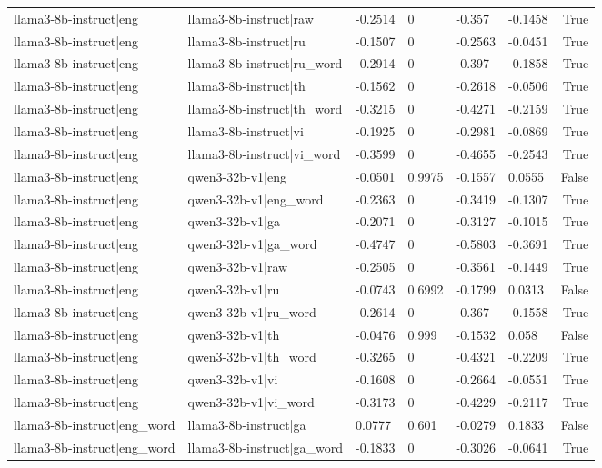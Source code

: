 \begin{table}
\begin{tabular}{llllllr}
llama3-8b-instruct|eng & llama3-8b-instruct|raw & -0.2514 & 0 & -0.357 & -0.1458 & True \\
llama3-8b-instruct|eng & llama3-8b-instruct|ru & -0.1507 & 0 & -0.2563 & -0.0451 & True \\
llama3-8b-instruct|eng & llama3-8b-instruct|ru_word & -0.2914 & 0 & -0.397 & -0.1858 & True \\
llama3-8b-instruct|eng & llama3-8b-instruct|th & -0.1562 & 0 & -0.2618 & -0.0506 & True \\
llama3-8b-instruct|eng & llama3-8b-instruct|th_word & -0.3215 & 0 & -0.4271 & -0.2159 & True \\
llama3-8b-instruct|eng & llama3-8b-instruct|vi & -0.1925 & 0 & -0.2981 & -0.0869 & True \\
llama3-8b-instruct|eng & llama3-8b-instruct|vi_word & -0.3599 & 0 & -0.4655 & -0.2543 & True \\
llama3-8b-instruct|eng & qwen3-32b-v1|eng & -0.0501 & 0.9975 & -0.1557 & 0.0555 & False \\
llama3-8b-instruct|eng & qwen3-32b-v1|eng_word & -0.2363 & 0 & -0.3419 & -0.1307 & True \\
llama3-8b-instruct|eng & qwen3-32b-v1|ga & -0.2071 & 0 & -0.3127 & -0.1015 & True \\
llama3-8b-instruct|eng & qwen3-32b-v1|ga_word & -0.4747 & 0 & -0.5803 & -0.3691 & True \\
llama3-8b-instruct|eng & qwen3-32b-v1|raw & -0.2505 & 0 & -0.3561 & -0.1449 & True \\
llama3-8b-instruct|eng & qwen3-32b-v1|ru & -0.0743 & 0.6992 & -0.1799 & 0.0313 & False \\
llama3-8b-instruct|eng & qwen3-32b-v1|ru_word & -0.2614 & 0 & -0.367 & -0.1558 & True \\
llama3-8b-instruct|eng & qwen3-32b-v1|th & -0.0476 & 0.999 & -0.1532 & 0.058 & False \\
llama3-8b-instruct|eng & qwen3-32b-v1|th_word & -0.3265 & 0 & -0.4321 & -0.2209 & True \\
llama3-8b-instruct|eng & qwen3-32b-v1|vi & -0.1608 & 0 & -0.2664 & -0.0551 & True \\
llama3-8b-instruct|eng & qwen3-32b-v1|vi_word & -0.3173 & 0 & -0.4229 & -0.2117 & True \\
llama3-8b-instruct|eng_word & llama3-8b-instruct|ga & 0.0777 & 0.601 & -0.0279 & 0.1833 & False \\
llama3-8b-instruct|eng_word & llama3-8b-instruct|ga_word & -0.1833 & 0 & -0.3026 & -0.0641 & True \\

\end{tabular}
\end{table}
